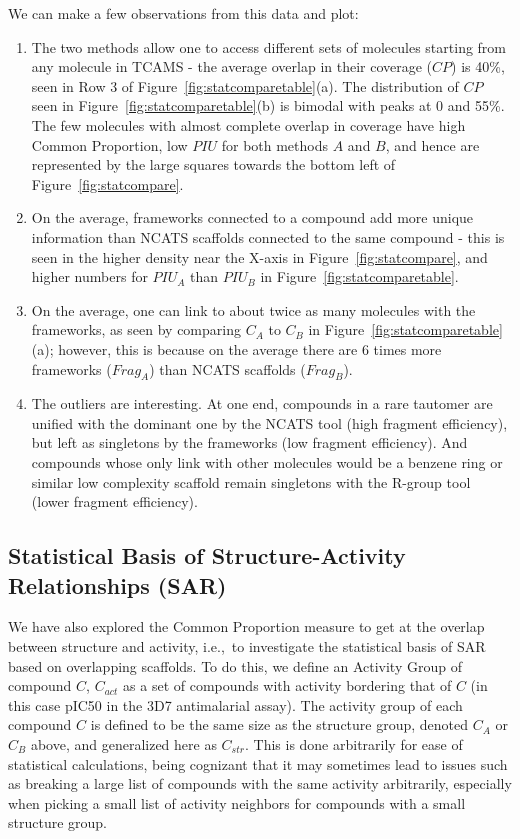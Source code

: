\documentclass[journal=jacsat,manuscript=article]{achemso}
\newcommand*\fref[1]{Figure~\ref{fig:#1}}
\newcommand*\eg{e.g.,~}
\newcommand*\ie{i.e.,~}
\begin{document}
We can make a few observations from this data and plot:
\begin{enumerate} 
\item The two methods allow one to access different sets of molecules starting from any molecule in TCAMS - the average overlap in their coverage ($CP$) is 40\%, seen in Row 3 of \fref{statcomparetable}(a).  The distribution of $CP$ seen in  \fref{statcomparetable}(b) is bimodal with peaks at 0 and 55\%. The few molecules with almost complete overlap in coverage have high Common Proportion, low $PIU$ for both methods $A$ and $B$, and hence are represented by the large squares towards the bottom left of \fref{statcompare}. 
\item On the average, frameworks connected to a compound add more unique information than NCATS scaffolds connected to the same compound - this is seen in the higher density near the X-axis in \fref{statcompare}, and higher numbers for $PIU_A$ than $PIU_B$ in  \fref{statcomparetable}.   
\item On the average, one can link to about twice as many molecules with the frameworks, as seen by comparing $C_A$ to $C_B$ in \fref{statcomparetable}(a); however, this is because on the average there are 6 times more frameworks ($Frag_A$) than NCATS scaffolds ($Frag_B$). %
\item The outliers are interesting. At one end, compounds in a rare tautomer are unified with the dominant one by the NCATS tool (high fragment efficiency), but left as singletons by the frameworks (low fragment efficiency). And compounds whose only link with other molecules would be a benzene ring or similar low complexity scaffold remain singletons with the R-group tool (lower fragment efficiency).
\end{enumerate}

\subsection{Statistical Basis of Structure-Activity Relationships (SAR)}\label{sec:statSAR}

We have also explored the Common Proportion measure to get at the overlap between structure and activity, \ie to investigate the statistical basis of SAR based on overlapping scaffolds. To do this, we define an Activity Group of compound $C$, $C_{act}$ as a set of compounds with activity bordering that of $C$ (in this case pIC50 in the 3D7 antimalarial assay). The activity group of each compound $C$ is defined to be the same size as the structure group, denoted $C_A$ or $C_B$ above, and generalized here as $C_{str}$.  This is done arbitrarily for ease of statistical calculations, being cognizant that it may sometimes lead to issues such as breaking a large list of compounds with the same activity arbitrarily, especially when picking a small list of activity neighbors for compounds with a small structure group.
\end{document}
